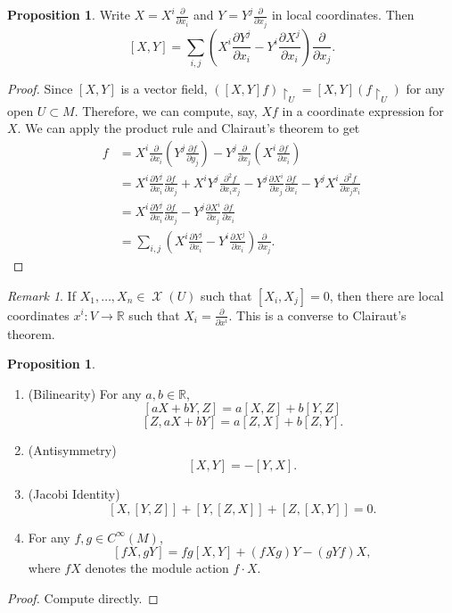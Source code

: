 \documentclass[10pt,letterpaper,cm]{nupset}
\theoremstyle{definition}
\theoremstyle{theorem}
\newtheorem{prop}[definition]{Proposition}
\theoremstyle{remark}
\newtheorem{remark}[definition]{Remark}
\newcommand{\R}{\mathbb R}
\newcommand{\1}{\mathbf{1}}
\newcommand{\0}{\vec 0}
\DeclareMathOperator{\vf}{\mathscr{X}}
\begin{document}
\begin{prop}
Write $X = X^i\frac{\partial}{\partial{x_i}}$ and $Y = Y^j \frac{\partial}{\partial{x_j}}$ in local coordinates. Then $$[X, Y] = \sum_{i, j}\left(X^i \frac{\partial{Y^j}}{\partial{x_i}} - Y^i\frac{\partial{X^j}}{\partial{x_i}}\right)\frac{\partial}{\partial{x_j}}.$$
\end{prop}
\begin{proof}
Since $[X, Y]$ is a vector field, $([X, Y]f) \restriction_U = [X, Y](f\restriction_U)$ for any open $U \subset M$. Therefore, we can compute, say, $Xf$ in a coordinate expression for $X$.  We can apply the product rule and Clairaut's theorem to get
\begin{align*}
[X, Y]f & = X^i \frac{\partial}{\partial{x_i}} \left(Y^j \frac{\partial{f}}{\partial{y_j}}\right) - Y^j \frac{\partial}{\partial{x_j}} \left(X^i \frac{\partial{f}}{\partial{x_i}}\right) 
\\ & =  X^i \frac{\partial{Y^j}}{\partial{x_i}}\frac{\partial{f}}{\partial{x_j}} + X^i Y^j \frac{\partial^2{f}}{\partial{x_i}{x_j}} - Y^j \frac{\partial{X^i}}{\partial{x_j}}\frac{\partial{f}}{\partial{x_i}} - Y^j X^i \frac{\partial^2{f}}{\partial{x_j}{x_i}}
 \\ & = X^i \frac{\partial{Y^j}}{\partial{x_i}}\frac{\partial{f}}{\partial{x_j}} -  Y^j \frac{\partial{X^i}}{\partial{x_j}}\frac{\partial{f}}{\partial{x_i}} 
 \\ & = \sum_{i, j}\left(X^i \frac{\partial{Y^j}}{\partial{x_i}} - Y^i\frac{\partial{X^j}}{\partial{x_i}}\right)\frac{\partial}{\partial{x_j}}.
 \end{align*}
\end{proof}

\begin{remark}
If $X_1, \ldots, X_n \in \vf(U)$ such that $[X_i, X_j]= 0$, then there are local coordinates $x^i : V \to \R$ such that $X_i  =\frac{\partial}{\partial{x^i}}$. This is a converse to Clairaut's theorem.
\end{remark}

\begin{prop} $ $
\begin{enumerate}
\item (Bilinearity) For any $a,b \in \R$, $$[aX + bY, Z] = a[X, Z] + b[Y, Z]$$ $$[Z, aX + bY] = a[Z, X] + b[Z, Y]. $$ 
\item (Antisymmetry) $$[X, Y] = {-[Y,X]}.$$
\item (Jacobi Identity) $$\left[X, [Y, Z]\right]+ \left[Y, [Z, X]\right] + \left[Z, [X, Y]\right] =0  . $$
\item For any $f, g \in C^{\infty}(M)$, $$[fX, gY] = fg[X, Y] + \left(fXg\right)Y - \left(gYf\right)X, $$ where $fX$ denotes the module action $f \cdot X$.
\end{enumerate}
\end{prop}
\begin{proof} Compute directly. \end{proof}
\end{document}
